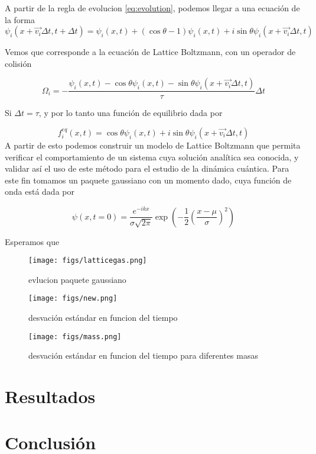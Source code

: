 \documentclass[12pts, letterpaper, twocolumn]{article}
\begin{document}
A partir de la regla de evolucion \ref{eq:evolution}, podemos llegar a una ecuación de la 
forma 
\begin{equation}\label{eq:QLG}
    \psi_i(x+\vec{v_i}\Delta t, t +\Delta t) = \psi_i(x,t) + (\cos\theta -1)\psi_i(x,t)
    + i\sin\theta\psi_i(x+\vec{v_i}\Delta t,t)
\end{equation}

Vemos que corresponde a la ecuación de Lattice Boltzmann, con un operador de colisión 

\begin{equation*}
    \Omega_i = -\frac{\psi_i(x,t)-\cos\theta\psi_i(x,t)
    -\sin\theta\psi_i(x+\vec{v_i}\Delta t,t)}{\tau}\Delta t
\end{equation*}

Si $\Delta t = \tau$, y por lo tanto una función de equilibrio dada por

\begin{equation*}
    f_i^{eq}(x,t)=\cos\theta\psi_i(x,t)+i\sin\theta\psi_i(x+\vec{v_i}\Delta t,t)
\end{equation*}
A partir de esto podemos construir un modelo de Lattice Boltzmann que permita verificar el
comportamiento de un sistema cuya solución analítica sea conocida, y validar así el uso de 
este método para el estudio de la dinámica cuántica. Para este fin tomamos un paquete 
gaussiano con un momento dado, cuya función de onda está dada por

\begin{equation*}
    \psi(x,t=0)=\frac{e^{-ikx}}{\sigma\sqrt{2\pi}}\exp{\left(-\frac{1}{2}\left(
        \frac{x-\mu}{\sigma}\right)^2\right)}
\end{equation*}

Esperamos que 

\begin{figure*}[h]
    \centering
    \texttt{[image: figs/latticegas.png]}
    \caption{evlucion paquete gaussiano}
    \label{fig:gauss}
\end{figure*}

\begin{figure*}[h]
    \centering
    \texttt{[image: figs/new.png]}
    \caption{desvación estándar en funcion del tiempo}
    \label{fig:sigma}
\end{figure*}

\begin{figure*}[h]
    \centering
    \texttt{[image: figs/mass.png]}
    \caption{desvación estándar en funcion del tiempo para diferentes masas}
    \label{fig:mass}
\end{figure*}


\section{Resultados}
\section{Conclusión}
\nocite{*}
\printbibliography
\end{document}
